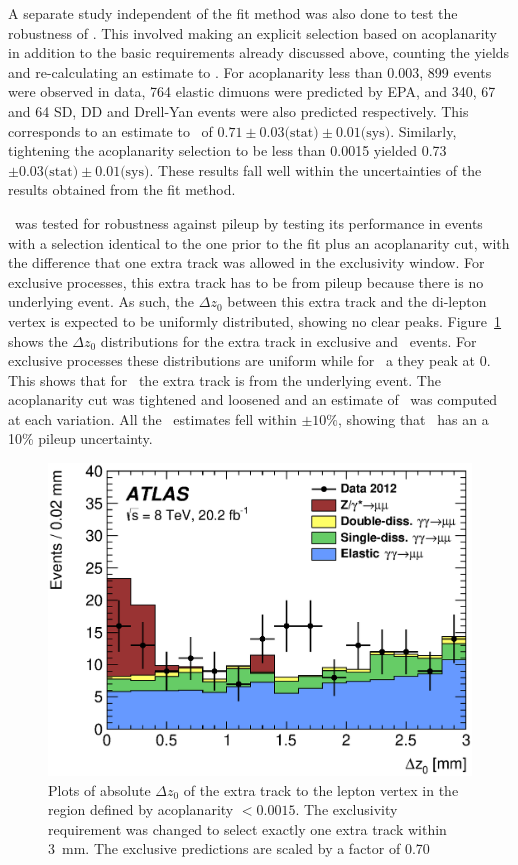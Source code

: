 \par A separate study independent of the fit method was also done to test the robustness of \fEL. 
This involved making an explicit selection based on acoplanarity in addition to the basic requirements 
already discussed above, counting the yields and re-calculating an estimate to \fEL. For acoplanarity less than 0.003, 
899 events were observed in data, 764 elastic dimuons were predicted by EPA, and 340, 67 and 64 SD, DD and Drell-Yan 
events were also predicted respectively. This corresponds to an estimate to \fEL\ of 
 $0.71 \pm0.03 \text{(stat)} \pm0.01 \text{(sys)}$. 
Similarly, tightening the acoplanarity selection to be less than 0.0015 yielded 0.73 $\pm0.03 \text{(stat)} \pm0.01 \text{(sys)}$.
These results fall well within the uncertainties of the results obtained from the fit method. 

\par \DZ\ was tested for robustness against pileup by testing its performance in events with a selection identical to 
the one prior to the fit plus an acoplanarity cut, with the difference that one extra track was allowed in the exclusivity 
window. For exclusive processes, this extra track has to be from pileup because there is no underlying 
event. As such, the $\Delta z_0$ between this extra track and the di-lepton vertex is expected to be 
uniformly distributed, showing no clear peaks. Figure~\ref{fig:dzEventOneTrk} shows the  $\Delta z_0$ 
distributions for the extra track in exclusive and \Zmm\ events. For exclusive processes these 
distributions are uniform while for \Zmm\ a they peak at 0. This shows that for \Zmm\ the extra track 
is from the underlying event. The acoplanarity cut was tightened and loosened and an estimate of \fEL\ was 
computed at each variation. All the \fEL\ estimates fell within $\pm10\%$, showing that \DZ\ has an a 10\% 
pileup uncertainty.   

\begin{figure}[!h]
\centering
 \includegraphics[width=0.8\linewidth]{figures/dilepton_dzone15.eps} 
 \caption{Plots of absolute $\Delta z_0$ of the extra track to the lepton vertex 
          in the region defined by acoplanarity $<0.0015$. The exclusivity 
          requirement was changed to select exactly one
          extra track within 3~mm.  The exclusive predictions are
 scaled by a factor of 0.70}
 \label{fig:dzEventOneTrk}
\end{figure}


